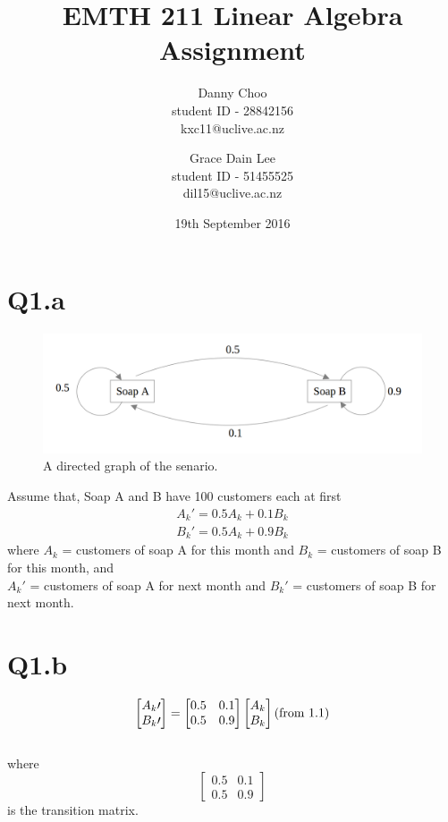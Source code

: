 \documentclass[10pt,a4paper]{article}
\title{EMTH 211 Linear Algebra \\ Assignment}
\author{
  Danny Choo\\
  {\small student ID - 28842156}\\
  {\small kxc11@uclive.ac.nz}
  \and
  Grace Dain Lee\\
  {\small student ID - 51455525}\\
  {\small dil15@uclive.ac.nz}
}
\date{19th September 2016}
\numberwithin{equation}{section}
\begin{document}
	\maketitle
	\section*{Q1.a}
	\begin{figure}[h!]
		  \includegraphics[width=\linewidth]{211_Image_edit.png}
		  \caption{A directed graph of the senario.}
		  \label{fig:boat1}
		\end{figure}
	
	
	
	Assume that, Soap A and B have 100 customers each at first\\
	\begin{align*}\label{eq1}
	A_{k}{\prime} = 0.5A_k + 0.1B_k \\	
	B_{k}{\prime} = 0.5A_k + 0.9B_k 	
	\end{align*}
	where $A_k$ = customers of soap A for this month and $B_k$ = customers of soap B for this month, and \\
	$A_{k}{\prime}$ = customers of soap A for next month and $B_{k}{\prime}$ = customers of soap B for next month. 
	\section*{Q1.b}
	\[\begin{bmatrix}
	A_{k}{\prime}\\
	B_{k}{\prime} 
	\end{bmatrix}
	=\begin{bmatrix}
	0.5 & 0.1 \\
	0.5 & 0.9
	\end{bmatrix}
	\begin{bmatrix}
	
	A_{k} \\
	B_{k}
	\end{bmatrix}\hfill\text{(from 1.1)}
	\]
	\\
	
	\noindent where  
	\[\begin{bmatrix}
		0.5 & 0.1 \\
		0.5 & 0.9
		\end{bmatrix}\]
		is the transition matrix.
		
\end{document}
